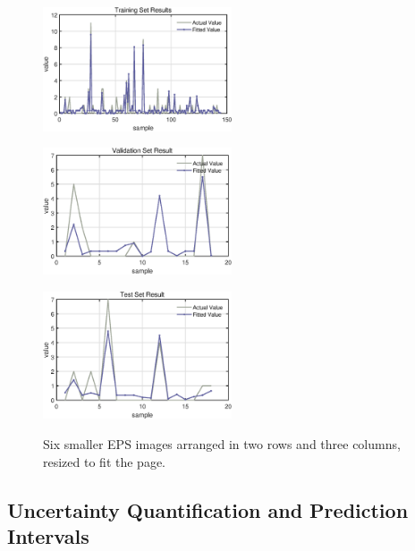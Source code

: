 \documentclass{mcmthesis}
\begin{document}
\begin{figure}[htbp]
    \begin{minipage}[t]{0.3\textwidth}
        \centering
        \includegraphics[width=2.2in, keepaspectratio]{pics/2.eps}
        \label{fig:image4}
    \end{minipage}
    \hfill
    \begin{minipage}[t]{0.3\textwidth}
        \centering
        \includegraphics[width=2.2in, keepaspectratio]{pics/4.eps}
        \label{fig:image5}
    \end{minipage}
    \hfill
    \begin{minipage}[t]{0.3\textwidth}
        \centering
        \includegraphics[width=2.2in, keepaspectratio]{pics/6.eps}
        \label{fig:image6}
    \end{minipage}
    
    \caption{Six smaller EPS images arranged in two rows and three columns, resized to fit the page.}
    \label{fig:smaller_eps_images}
\end{figure}


    

\subsection{Uncertainty Quantification and Prediction Intervals}
\end{document}
